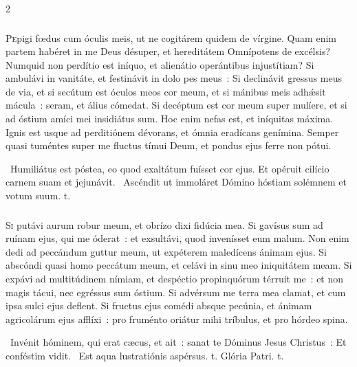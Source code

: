 \documentclass[9pt,twoside]{extarticle}
\begin{document}
\begin{multicols}{2}
{{{\subsubsection*{\center{}}
\lettrine{P}epigi fœdus cum óculis meis, ut ne cogitárem quidem de vírgine. Quam enim partem habéret in me Deus désuper, et hereditátem Omnípotens de excélsis? Numquid non perdítio est iníquo, et alienátio operántibus injustítiam? Si ambulávi in vanitáte, et festinávit in dolo pes meus~: Si declinávit gressus meus de via, et si secútum est óculos meos cor meum, et si mánibus meis adhǽsit mácula~: seram, et álius cómedat. Si decéptum est cor meum super mulíere, et si ad óstium amíci mei insidiátus sum. Hoc enim nefas est, et iníquitas máxima. Ignis est usque ad perditiónem dévorans, et ómnia eradícans genímina. Semper quasi tuméntes super me fluctus tímui Deum, et pondus ejus ferre non pótui. 

\begin{tightlist}{}
\item {}~Humiliátus est póstea, eo quod exaltátum fuísset cor ejus. \textred{*} Et opéruit cilício carnem suam et jejunávit. ~Ascéndit ut immoláret Dómino hóstiam solémnem et votum suum. t.
\end{tightlist}

\subsubsection*{\center {}}
\lettrine{S}i putávi aurum robur meum, et obrízo dixi fidúcia mea. Si gavísus sum ad ruínam ejus, qui me óderat~: et exsultávi, quod invenísset eum malum. Non enim dedi ad peccándum guttur meum, ut expéterem maledícens ánimam ejus. Si abscóndi quasi homo peccátum meum, et celávi in sinu meo iniquitátem meam. Si expávi ad multitúdinem nímiam, et despéctio propinquórum térruit me~: et non magis tácui, nec egréssus sum óstium. Si advérsum me terra mea clamat, et cum ipsa sulci ejus deflent. Si fructus ejus comédi absque pecúnia, et ánimam agricolárum ejus afflíxi~: pro fruménto oriátur mihi tríbulus, et pro hórdeo spina. 

\begin{tightlist}{}
\item {}~Invénit hóminem, qui erat cæcus, et ait~: sanat te Dóminus Jesus Christus~: \textred{*} Et conféstim vidit. ~Est aqua lustratiónis aspérsus. t. Glória Patri. t.
\end{tightlist}

}}}
\end{multicols}
\end{document}
